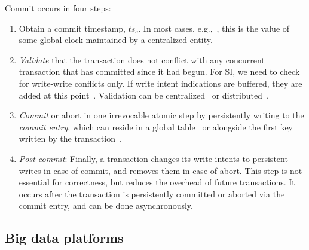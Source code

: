 {%

  Commit occurs in four steps:
  \begin{enumerate}
    \setlength{\itemsep}{0pt}
    \setlength{\parskip}{0pt}
    \setlength{\parsep}{2pt}  
  \item
  Obtain a commit timestamp, $ts_c$. 
  In most cases, e.g.,~\cite{Percolator2010,OmidICDE2014,Omid2017,tephra}, 
  this is the value of some global clock maintained by a centralized entity. 
  \item \emph{Validate} that the transaction does not conflict with any concurrent transaction that has committed since it 
had begun.  For SI, we need to check for write-write conflicts only. 
If write intent indications are buffered, they are added at this point~\cite{Percolator2010}.
Validation can be centralized~\cite{OmidICDE2014,Omid2017,tephra} or distributed~\cite{Percolator2010,cockroach}. 


\item \emph{Commit} or abort in one  irrevocable atomic step by persistently writing to the \emph{commit entry}, 
  which can reside in a global table~\cite{Omid2017,cockroach} or alongside the first  key written by 
  the transaction~\cite{Percolator2010}.  
  
 \item \emph{Post-commit}: 
  Finally, a transaction changes its write intents to
  persistent writes in case of commit, and removes them in case of abort. This
  step is not essential for correctness, but reduces the overhead of future transactions. It
  occurs after the transaction is persistently committed or aborted via the commit entry, 
  and can be done asynchronously.
 \end{enumerate}
 

\subsection{Big data platforms}
\label{ssec:bigdata}

}

